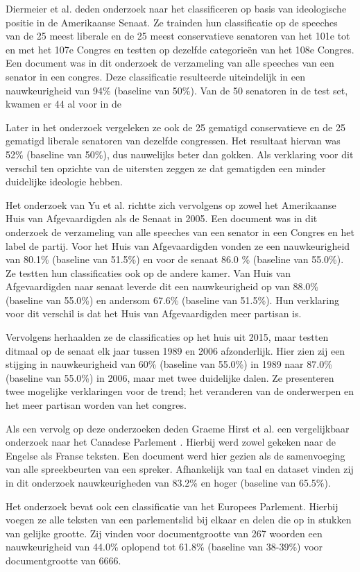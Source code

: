 Diermeier et al. deden onderzoek naar het classificeren op basis van ideologische positie in de Amerikaanse Senaat\cite{diermeier_godbout_yu_kaufmann_2012}. Ze trainden hun classificatie op de speeches van de 25 meest liberale en de 25 meest conservatieve senatoren van het 101e tot en met het 107e Congres en testten op dezelfde categorieën van het 108e Congres. Een document was in dit onderzoek de verzameling van alle speeches van een senator in een congres. Deze classificatie resulteerde uiteindelijk in een nauwkeurigheid van 94\% (baseline van 50\%). Van de 50 senatoren in de test set, kwamen er 44 al voor in de \par
Later in het onderzoek vergeleken ze ook de 25 gematigd conservatieve  en de 25 gematigd liberale senatoren van dezelfde congressen. Het resultaat hiervan was 52\% (baseline van 50\%), dus nauwelijks beter dan gokken. Als verklaring voor dit verschil ten opzichte van de uitersten zeggen ze dat gematigden een minder duidelijke ideologie hebben.\par
Het onderzoek van Yu et al. \cite{doi:10.1080/19331680802149608} richtte zich vervolgens op zowel het Amerikaanse Huis van Afgevaardigden als de Senaat in 2005. Een document was in dit onderzoek de verzameling van alle speeches van een senator in een Congres en het label de partij. Voor het Huis van Afgevaardigden vonden ze een nauwkeurigheid van 80.1\% (baseline van 51.5\%) en voor de senaat 86.0 \% (baseline van 55.0\%). Ze testten hun classificaties ook op de andere kamer. Van Huis van Afgevaardigden naar senaat leverde dit een nauwkeurigheid op van 88.0\% (baseline van 55.0\%) en andersom 67.6\% (baseline van 51.5\%). Hun verklaring voor dit verschil is dat het Huis van Afgevaardigden meer partisan is.\par
Vervolgens herhaalden ze de classificaties op het huis uit 2015, maar testten ditmaal op de senaat elk jaar tussen 1989 en 2006 afzonderlijk. Hier zien zij een stijging in nauwkeurigheid van 60\% (baseline van 55.0\%) in 1989 naar 87.0\% (baseline van 55.0\%) in 2006, maar met twee duidelijke dalen. Ze presenteren twee mogelijke verklaringen voor de trend; het veranderen van de onderwerpen en het meer partisan worden van het congres. \par
Als een vervolg op deze onderzoeken deden Graeme Hirst et al. een vergelijkbaar onderzoek naar het Canadese Parlement \cite{Hirst_textto}. Hierbij werd zowel gekeken naar de Engelse als Franse teksten. Een document werd hier gezien als de samenvoeging van alle spreekbeurten van een spreker. Afhankelijk van taal en dataset vinden zij in dit onderzoek nauwkeurigheden van 83.2\%  en hoger (baseline van 65.5\%).\par
Het onderzoek bevat ook een classificatie van het Europees Parlement. Hierbij voegen ze alle teksten van een parlementslid bij elkaar en delen die op in stukken van gelijke grootte. Zij vinden voor documentgrootte van 267 woorden een nauwkeurigheid van 44.0\% oplopend tot 61.8\% (baseline van 38-39\%) voor documentgrootte van 6666.\par

